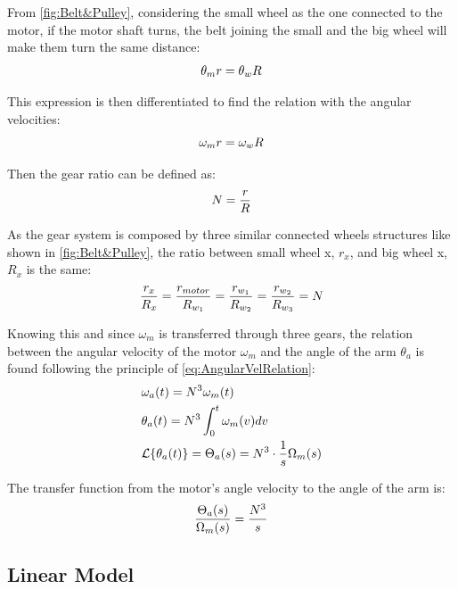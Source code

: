 From \autoref{fig:Belt&Pulley}, considering the small wheel as the one connected to the motor, if the motor shaft turns, the belt joining the small and the big wheel will make them turn the same distance:
\begin{equation}
	\theta_m r = \theta_w R \addunit{\meter}
\end{equation}

This expression is then differentiated to find the relation with the angular velocities:
\begin{equation}
	\omega_m r = \omega_w R\addunit{\meter\per\second}
	\label{eq:AngularVelRelation}
\end{equation}

Then the gear ratio can be defined as: 
\begin{equation}
	N = \frac{r}{R} \addunit{1}
	\label{eq:GearRatio}
\end{equation}

As the gear system is composed by three similar connected wheels structures like shown in \autoref{fig:Belt&Pulley}, the ratio between small wheel x, $r_x$, and big wheel x, $R_x$ is the same:
\begin{equation}
	\frac{r_x}{R_x} = \frac{r_{motor}}{R_{w_1}} = \frac{r_{w_1}}{R_{w_2}} = \frac{r_{w_2}}{R_{w_3}} = N \addunit{1}
\end{equation}

Knowing this and since $\omega_m$ is transferred through three gears, the relation between the angular velocity of the motor $\omega_m$ and the angle of the arm $\theta_a$ is found following the principle of \autoref{eq:AngularVelRelation}:
\begin{subequations} \label{eq:tech_ToA}
	\begin{flalign}
		&\omega_a(t) = N^3 \omega_m(t) \\
		&\theta_a(t) = N^3 \int_{0}^{t}\omega_m(v) dv \\
		&\mathcal{L}\{\theta_a(t)\} = \Theta_a(s) = N^3 \cdot \frac{1}{s} \Omega_m(s) \addunit{1}
	\end{flalign}
\end{subequations}

The transfer function from the motor's angle velocity to the angle of the arm is:
\begin{equation}\label{eq:thetaOmega}
	\frac{\Theta_a(s)}{\Omega_m(s)} =  \frac{N^3}{s} \addunit{1}
\end{equation}

\subsection{Linear Model}

